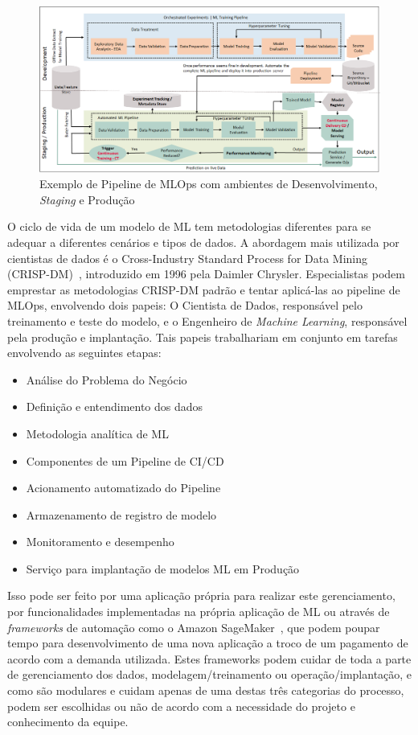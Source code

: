 \documentclass[Portugues,Final]{ic-tese-v3}
\begin{document}
\begin{figure}[H]
\centering
\includegraphics[scale=0.33]{images/mlops-pipeline-example.png}
\caption {Exemplo de Pipeline de MLOps com ambientes de Desenvolvimento, \textit{Staging} e Produção~\cite{Tripathi_2021}}
\label{fig:MLOpsPipeline}
\end{figure}

O ciclo de vida de um modelo de ML tem metodologias diferentes para se adequar a diferentes cenários e tipos de dados. A abordagem mais utilizada por cientistas de dados é o Cross-Industry Standard Process for Data Mining (CRISP-DM)~\cite{Shearer_2000}, introduzido em 1996 pela Daimler Chrysler. Especialistas podem emprestar as metodologias CRISP-DM padrão e tentar aplicá-las ao pipeline de MLOps, envolvendo dois papeis: O Cientista de Dados, responsável pelo treinamento e teste do modelo, e o Engenheiro de \textit{Machine Learning}, responsável pela produção e implantação. Tais papeis trabalhariam em conjunto em tarefas envolvendo as seguintes etapas:

\begin{itemize}
    \item Análise do Problema do Negócio
    \item Definição e entendimento dos dados
    \item Metodologia analítica de ML
    \item Componentes de um Pipeline de CI/CD
    \item Acionamento automatizado do Pipeline
    \item Armazenamento de registro de modelo
    \item Monitoramento e desempenho
    \item Serviço para implantação de modelos ML em Produção
\end{itemize}

Isso pode ser feito por uma aplicação própria para realizar este gerenciamento, por funcionalidades implementadas na própria aplicação de ML ou através de \textit{frameworks} de automação como o Amazon SageMaker~\cite{Amazon_2023}, que podem poupar tempo para desenvolvimento de uma nova aplicação a troco de um pagamento de acordo com a demanda utilizada. Estes frameworks podem cuidar de toda a parte de gerenciamento dos dados, modelagem/treinamento ou operação/implantação, e como são modulares e cuidam apenas de uma destas três categorias do processo, podem ser escolhidas ou não de acordo com a necessidade do projeto e conhecimento da equipe.
\end{document}

